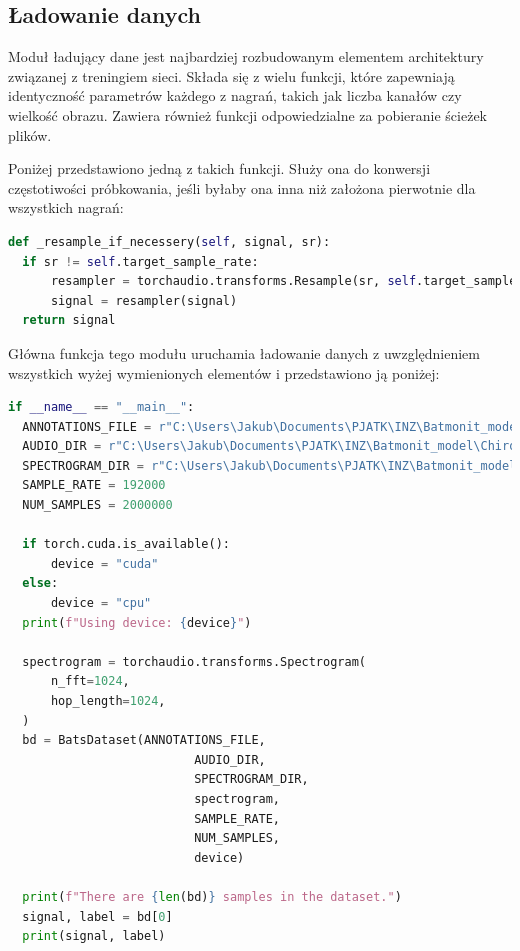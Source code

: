 \documentclass{sprz}
\begin{document}
\subsection{Ładowanie danych}

Moduł ładujący dane jest najbardziej rozbudowanym elementem architektury związanej z treningiem sieci. Składa się z wielu funkcji, które zapewniają identyczność parametrów każdego z nagrań, takich jak liczba kanałów czy wielkość obrazu. Zawiera również funkcji odpowiedzialne za pobieranie ścieżek plików.

Poniżej przedstawiono jedną z takich funkcji. Służy ona do konwersji częstotiwości próbkowania, jeśli byłaby ona inna niż założona pierwotnie dla wszystkich nagrań:

\begin{lstlisting}[language=Python,caption={Implementacja konwersji dźwięku na spektrogram}, label={lst:audio-to-spectrogram}]
  def _resample_if_necessery(self, signal, sr):
  if sr != self.target_sample_rate:
      resampler = torchaudio.transforms.Resample(sr, self.target_sample_rate)
      signal = resampler(signal)
  return signal
\end{lstlisting}

Główna funkcja tego modułu uruchamia ładowanie danych z uwzględnieniem wszystkich wyżej wymienionych elementów i przedstawiono ją poniżej:

\begin{lstlisting}[language=Python,caption={Implementacja modułu do ładowania danych}, label={lst:audio-to-spectrogram}]
  if __name__ == "__main__":
  ANNOTATIONS_FILE = r"C:\Users\Jakub\Documents\PJATK\INZ\Batmonit_model\Chiro_sounds_signed\Metadata\Annotations.csv"
  AUDIO_DIR = r"C:\Users\Jakub\Documents\PJATK\INZ\Batmonit_model\Chiro_sounds_signed\Audio"
  SPECTROGRAM_DIR = r"C:\Users\Jakub\Documents\PJATK\INZ\Batmonit_model\Chiro_sounds_signed\Spectrogram"
  SAMPLE_RATE = 192000
  NUM_SAMPLES = 2000000

  if torch.cuda.is_available():
      device = "cuda"
  else:
      device = "cpu"
  print(f"Using device: {device}")

  spectrogram = torchaudio.transforms.Spectrogram(
      n_fft=1024,
      hop_length=1024,
  )
  bd = BatsDataset(ANNOTATIONS_FILE,
                          AUDIO_DIR,
                          SPECTROGRAM_DIR, 
                          spectrogram, 
                          SAMPLE_RATE,
                          NUM_SAMPLES,
                          device)

  print(f"There are {len(bd)} samples in the dataset.")
  signal, label = bd[0]
  print(signal, label)
\end{lstlisting}
\end{document}
